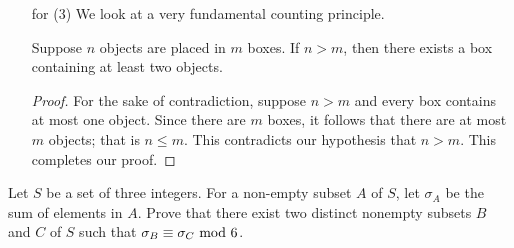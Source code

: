 \begin{example}
\begin{itemize}[itemsep=1em,leftmargin=4em]
\item[for (3)] We look at a very fundamental counting principle.
\begin{theorem}
Suppose $n$ objects are placed in $m$ boxes. If $n > m$, then there exists a box containing at least two objects. 
\end{theorem}\vspace*{-1em}
\begin{proof}
For the sake of contradiction, suppose $n > m$ and every box contains at most one object. Since there are $m$ boxes, it follows that there are at most $m$ objects; that is $n \leq m$. This contradicts our hypothesis that $n > m$. This completes our proof.
\end{proof}
\end{itemize}
\end{example}

\vspace*{1em}

\begin{example}
Let $S$ be a set of three integers. For a non-empty subset $A$ of $S$, let $\sigma_A$ be the sum of elements in $A$. Prove that there exist two distinct nonempty subsets $B$ and $C$ of $S$ such that $\sigma_B \equiv \sigma_C \text{ mod }{6}$.
\end{example}

